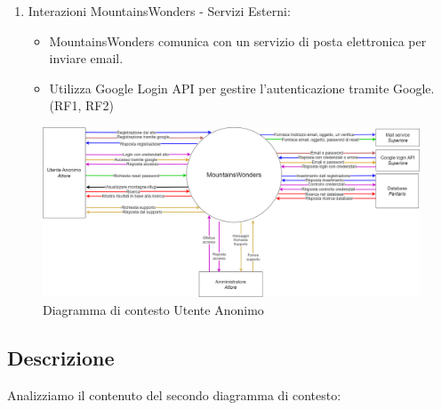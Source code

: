 \documentclass[a4paper,12pt]{article}
\begin{document}
\begin{enumerate}
    \item Interazioni MountainsWonders - Servizi Esterni:
    \begin{itemize}
        \item MountainsWonders comunica con un servizio di posta elettronica per inviare email.
        \item Utilizza Google Login API per gestire l'autenticazione tramite Google. (RF1, RF2)
    \end{itemize}
    
\end{enumerate}

\begin{figure}[H]
   \centering   \includegraphics[width=1.0\textwidth]{img/contesto_anonimo.png}
    \caption{Diagramma di contesto Utente Anonimo}
\end{figure}



\subsection{Descrizione}
Analizziamo il contenuto del secondo diagramma di contesto:
\end{document}
